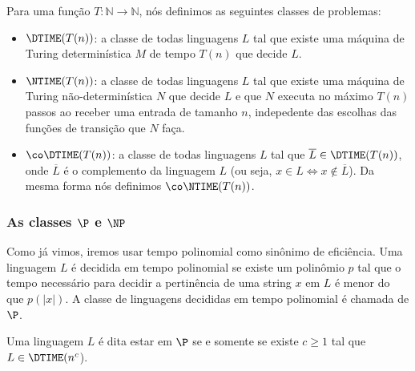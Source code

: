 \begin{defi}

Para uma função $T: \mathbb{N} \to \mathbb{N}$, nós definimos as seguintes classes de problemas:

\begin{itemize}

\item $\text{\DTIME}(T(n))$: a classe de todas linguagens $L$ tal que existe uma máquina de Turing determinística $M$ de tempo $T(n)$ que decide $L$.

\item $\text{\NTIME}(T(n))$: a classe de todas linguagens $L$ tal que existe uma máquina de Turing não-determinística $N$ que decide $L$ e que $N$ executa no máximo $T(n)$ passos ao receber uma entrada de tamanho $n$, indepedente das escolhas das funções de transição que $N$ faça.

\item $\text{\co\DTIME}(T(n))$: a classe de todas linguagens $L$ tal que $\overline{L} \in \text{\DTIME}(T(n))$, onde $\overline{L}$ é o complemento da linguagem $L$ (ou seja, $x \in L \iff x \notin \overline{L}$). Da mesma forma nós definimos $\text{\co\NTIME}(T(n))$.

\end{itemize}

\end{defi}


\subsubsection{As classes $\P$ e $\NP$}


Como já vimos, iremos usar tempo polinomial como sinônimo de eficiência. Uma linguagem $L$ é decidida em tempo polinomial se existe um polinômio $p$ tal que o tempo necessário para decidir a pertinência de uma string $x$ em $L$ é menor do que $p(\lvert x \rvert)$. A classe de linguagens decididas em tempo polinomial é chamada de $\P$.

\begin{defi} [A classe $\P$]

Uma linguagem $L$ é dita estar em $\P$ se e somente se existe $c \geq 1$ tal que $L \in \text{\DTIME}(n^{c}$).

\end{defi}


